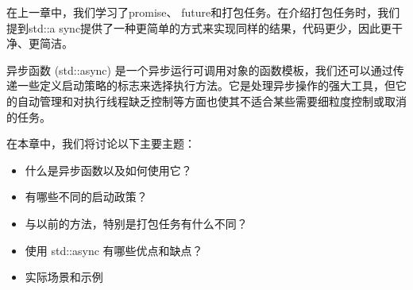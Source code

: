 在上一章中，我们学习了promise、 future和打包任务。在介绍打包任务时，我们提到std::a sync提供了一种更简单的方式来实现同样的结果，代码更少，因此更干净、更简洁。

异步函数 (std::async) 是一个异步运行可调用对象的函数模板，我们还可以通过传递一些定义启动策略的标志来选择执行方法。它是处理异步操作的强大工具，但它的自动管理和对执行线程缺乏控制等方面也使其不适合某些需要细粒度控制或取消的任务。

在本章中，我们将讨论以下主要主题：

\begin{itemize}
\item
什么是异步函数以及如何使用它？

\item
有哪些不同的启动政策？

\item
与以前的方法，特别是打包任务有什么不同？

\item
使用 std::async 有哪些优点和缺点？

\item
实际场景和示例
\end{itemize}